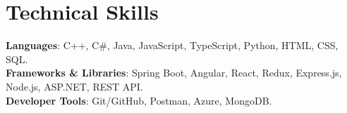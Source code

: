 \section{Technical Skills}
\begin{itemize}[leftmargin=0.15in, label={}]
    \small{\item{
        \textbf{Languages}{: C++, C\#, Java, JavaScript, TypeScript, Python, HTML, CSS, SQL.} \\
     
        \textbf{Frameworks \& Libraries}{: Spring Boot, Angular, React, Redux, Express.js, Node.js, ASP.NET, REST API.} \\

        \textbf{Developer Tools}{: Git/GitHub, Postman, Azure, MongoDB.} \\
    }}
\end{itemize}